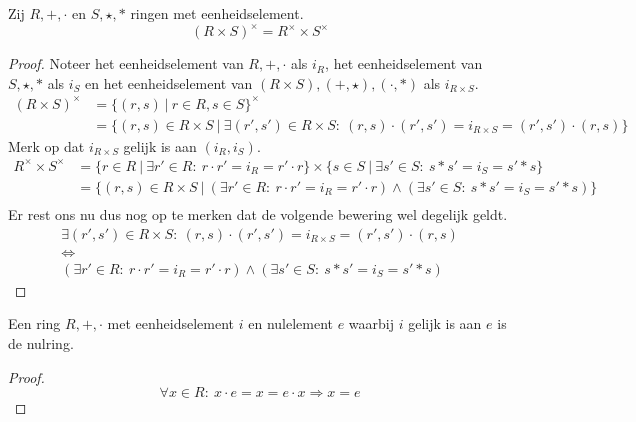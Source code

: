 \documentclass[main.tex]{subfiles}
\begin{document}
\begin{st}
  Zij $R,+,\cdot$ en $S,\star,*$ ringen met eenheidselement.
  \[ (R \times S)^{\times} = R^{\times}\times S^{\times} \]

  \begin{proof}
    Noteer het eenheidselement van $R,+,\cdot$ als $i_{R}$, het eenheidselement van $S,\star,*$ als $i_{S}$ en het eenheidselement van $(R \times S),(+,\star),(\cdot,*)$ als $i_{R \times S}$.
    \[
    \begin{array}{rll}
      (R \times S)^{\times} &= \{ (r,s) \ |\ r \in R, s \in S \}^{\times} &\\
                          &= \{ (r,s) \in R\times S \ |\ \exists (r',s') \in R\times S:\ (r,s) \cdot (r',s') = i_{R \times S} = (r',s') \cdot (r,s) \}
    \end{array}
    \]
    Merk op dat $i_{R\times S}$ gelijk is aan $(i_{R},i_{S})$.
    \[
    \begin{array}{rll}
      R^{\times} \times S^{\times} &= \{ r \in R \ |\ \exists r' \in R:\ r \cdot r' = i_{R} = r' \cdot r \} \times \{ s \in S \ |\ \exists s' \in S:\ s * s' = i_{S} = s' * s \} &\\
                               &= \{ (r,s) \in R \times S \ |\ (\exists r' \in R:\ r \cdot r' = i_{R} = r' \cdot r) \wedge (\exists s' \in S:\ s * s' = i_{S} = s' * s) \} &\\
    \end{array}
    \]
    Er rest ons nu dus nog op te merken dat de volgende bewering wel degelijk geldt.
    \[
    \begin{array}{c}
      \exists (r',s') \in R\times S:\ (r,s) \cdot (r',s') = i_{R \times S} = (r',s') \cdot (r,s)\\
      \Leftrightarrow \\
      (\exists r' \in R:\ r \cdot r' = i_{R} = r' \cdot r) \wedge (\exists s' \in S:\ s * s' = i_{S} = s' * s)
    \end{array}
    \]
  \end{proof}
\end{st}

\begin{st}
  \label{st:nulring-nul-is-een}
  Een ring $R,+,\cdot$ met eenheidselement $i$ en nulelement $e$ waarbij $i$ gelijk is aan $e$ is de nulring.
  \begin{proof}
    \[ \forall x \in R:\ x \cdot e = x = e \cdot x \Rightarrow x = e \]
  \end{proof}
\end{st}
\end{document}

